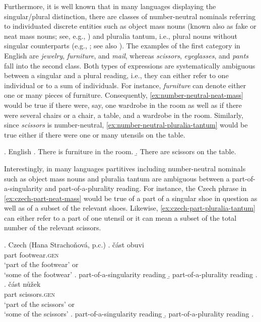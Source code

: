 Furthermore, it is well known that in many languages displaying the singular/plural distinction, there are classes of number-neutral nominals referring to individuated discrete entities such as object mass nouns (known also as fake or neat mass nouns; see, e.g., \citealt{gillon1992towards,chierchia1998plurality,chierchia2010mass,barner_snedeker2005quantity,bale_barner2009interpretation,landman2011count}) and pluralia tantum, i.e., plural nouns without singular counterparts (e.g., \citealt{wierzbicka1988semantics,corbett2000number,koptjevskaja-tamm_walchli2001circum,wisniewski2010using}; see also \citealt{wagiel2015counting,wagiel2017pairs}). The examples of the first category in English are \textit{jewelry}, \textit{furniture}, and \textit{mail}, whereas \textit{scissors}, \textit{eyeglasses}, and \textit{pants} fall into the second class. Both types of expressions are systematically ambiguous between a singular and a plural reading, i.e., they can either refer to one individual or to a sum of individuals. For instance, \textit{furniture} can denote either one or many pieces of furniture. Consequently, \ref{ex:number-neutral-neat-mass} would be true if there were, say, one wardrobe in the room as well as if there were several chairs or a chair, a table, and a wardrobe in the room. Similarly, since \textit{scissors} is number-neutral, \ref{ex:number-neutral-pluralia-tantum} would be true either if there were one or many utensils on the table.

\ex.\label{ex:number-neutral} English
\a. There is furniture in the room.\label{ex:number-neutral-neat-mass}
\b. There are scissors on the table.\label{ex:number-neutral-pluralia-tantum}

Interestingly, in many languages partitives including number-neutral nominals such as object mass nouns and pluralia tantum are ambiguous between a part-of-a-singularity and part-of-a-plurality reading. For instance, the Czech phrase in \ref{ex:czech-part-neat-mass} would be true of a part of a singular shoe in question as well as of a subset of the relevant shoes. Likewise, \ref{ex:czech-part-pluralia-tantum} can either refer to a part of one utensil or it can mean a subset of the total number of the relevant scissors. 

\ex.\label{ex:czech-part} Czech (Hana Strachoňová, p.c.)
\ag. část obuvi\label{ex:czech-part-neat-mass}\\
part footwear\textsc{.gen}\\
`part of the footwear' or\\
`some of the footwear'
\a. part-of-a-singularity reading
\b. part-of-a-plurality reading
\z.
\bg. část nůžek\label{ex:czech-part-pluralia-tantum}\\
part scissors\textsc{.gen}\\
`part of the scissors' or\\
`some of the scissors'
\a. part-of-a-singularity reading
\b. part-of-a-plurality reading
\z.

